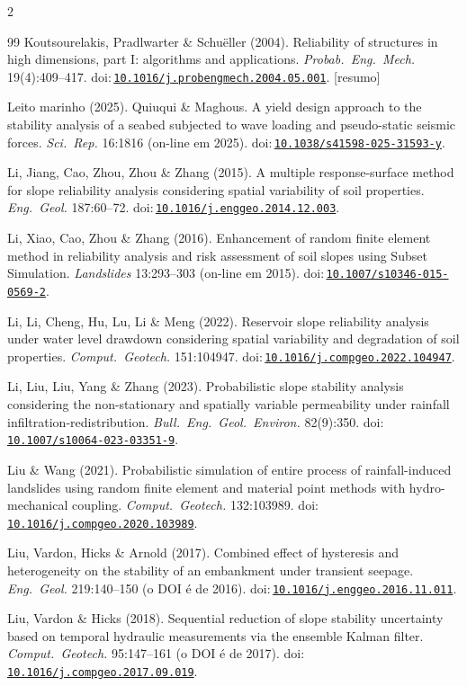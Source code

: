 \documentclass[11pt,a4paper]{article}
\newcommand{\doi}[1]{doi:\,\href{https://doi.org/#1}{\nolinkurl{#1}}}
\begin{document}
\begin{multicols}{2}
\begin{thebibliography}{99}
 Koutsourelakis, Pradlwarter \& Schuëller (2004). Reliability of
structures in high dimensions, part I: algorithms and applications. \emph{Probab.\ Eng.\ Mech.} 19(4):409--417.
\doi{10.1016/j.probengmech.2004.05.001}. [resumo]

 Leito marinho (2025). Quiuqui \& Maghous. A yield design approach to the
stability analysis of a seabed subjected to wave loading and pseudo-static seismic forces. \emph{Sci.\ Rep.} 16:1816
(on-line em 2025). \doi{10.1038/s41598-025-31593-y}.

 Li, Jiang, Cao, Zhou, Zhou \& Zhang (2015). A multiple response-surface method for
slope reliability analysis considering spatial variability of soil properties. \emph{Eng.\ Geol.} 187:60--72.
\doi{10.1016/j.enggeo.2014.12.003}.

 Li, Xiao, Cao, Zhou \& Zhang (2016). Enhancement of random finite element method in
reliability analysis and risk assessment of soil slopes using Subset Simulation. \emph{Landslides} 13:293--303 (on-line
em 2015). \doi{10.1007/s10346-015-0569-2}.

 Li, Li, Cheng, Hu, Lu, Li \& Meng (2022). Reservoir slope reliability analysis under
water level drawdown considering spatial variability and degradation of soil properties. \emph{Comput.\ Geotech.}
151:104947. \doi{10.1016/j.compgeo.2022.104947}.

 Li, Liu, Liu, Yang \& Zhang (2023). Probabilistic slope stability analysis
considering the non-stationary and spatially variable permeability under rainfall infiltration-redistribution.
\emph{Bull.\ Eng.\ Geol.\ Environ.} 82(9):350. \doi{10.1007/s10064-023-03351-9}.

 Liu \& Wang (2021). Probabilistic simulation of entire process of
rainfall-induced landslides using random finite element and material point methods with hydro-mechanical coupling.
\emph{Comput.\ Geotech.} 132:103989. \doi{10.1016/j.compgeo.2020.103989}.

 Liu, Vardon, Hicks \& Arnold (2017). Combined effect of hysteresis and heterogeneity
on the stability of an embankment under transient seepage. \emph{Eng.\ Geol.} 219:140--150 (o DOI é de 2016).
\doi{10.1016/j.enggeo.2016.11.011}.

 Liu, Vardon \& Hicks (2018). Sequential reduction of slope stability uncertainty
based on temporal hydraulic measurements via the ensemble Kalman filter. \emph{Comput.\ Geotech.} 95:147--161 (o DOI é
de 2017). \doi{10.1016/j.compgeo.2017.09.019}.


\end{thebibliography}
\end{multicols}
\end{document}

